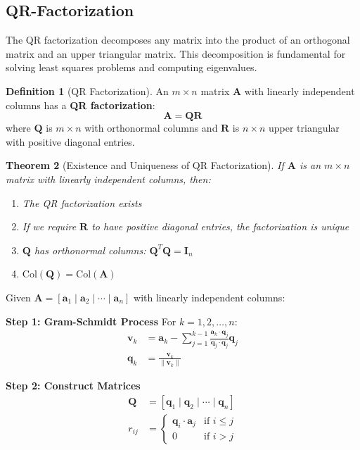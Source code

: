 \documentclass[12pt]{article}
\numberwithin{equation}{section}
\newcommand{\vect}[1]{\boldsymbol{#1}}   %
\newcommand{\mat}[1]{\mathbf{#1}}        %
\theoremstyle{plain}
\newtheorem{theorem}{Theorem}[section]
\theoremstyle{definition}
\newtheorem{definition}[theorem]{Definition}
\theoremstyle{remark}
\begin{document}
\subsection{QR-Factorization}

The QR factorization decomposes any matrix into the product of an orthogonal matrix and an upper triangular matrix. This decomposition is fundamental for solving least squares problems and computing eigenvalues.

\begin{definition}[QR Factorization]
An $m \times n$ matrix $\mat{A}$ with linearly independent columns has a \textbf{QR factorization}:
$$\mat{A} = \mat{Q}\mat{R}$$
where $\mat{Q}$ is $m \times n$ with orthonormal columns and $\mat{R}$ is $n \times n$ upper triangular with positive diagonal entries.
\end{definition}

\begin{theorem}[Existence and Uniqueness of QR Factorization]
If $\mat{A}$ is an $m \times n$ matrix with linearly independent columns, then:
\begin{enumerate}
\item The QR factorization exists
\item If we require $\mat{R}$ to have positive diagonal entries, the factorization is unique
\item $\mat{Q}$ has orthonormal columns: $\mat{Q}^T\mat{Q} = \mat{I}_n$
\item $\text{Col}(\mat{Q}) = \text{Col}(\mat{A})$
\end{enumerate}
\end{theorem}

\begin{algorithm}[H]
\caption{Gram-Schmidt QR Factorization}
Given $\mat{A} = [\vect{a}_1 \mid \vect{a}_2 \mid \cdots \mid \vect{a}_n]$ with linearly independent columns:

\textbf{Step 1: Gram-Schmidt Process}
For $k = 1, 2, \ldots, n$:
\begin{align}
\vect{v}_k &= \vect{a}_k - \sum_{j=1}^{k-1} \frac{\vect{a}_k \cdot \vect{q}_j}{\vect{q}_j \cdot \vect{q}_j} \vect{q}_j\\
\vect{q}_k &= \frac{\vect{v}_k}{\|\vect{v}_k\|}
\end{align}

\textbf{Step 2: Construct Matrices}
\begin{align}
\mat{Q} &= [\vect{q}_1 \mid \vect{q}_2 \mid \cdots \mid \vect{q}_n]\\
r_{ij} &= \begin{cases}
\vect{q}_i \cdot \vect{a}_j & \text{if } i \leq j\\
0 & \text{if } i > j
\end{cases}
\end{align}
\end{algorithm}
\end{document}
